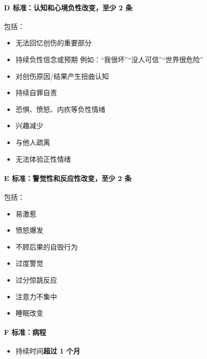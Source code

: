 \documentclass[
  chinese,
  9pt,
  a4paper,
]{ctexart}
\providecommand{\tightlist}{%
  \setlength{\itemsep}{0pt}\setlength{\parskip}{0pt}}
\begin{document}
\paragraph{D 标准：认知和心境负性改变，至少 2
条}\label{d-ux6807ux51c6ux8ba4ux77e5ux548cux5fc3ux5883ux8d1fux6027ux6539ux53d8ux81f3ux5c11-2-ux6761}

包括：

\begin{itemize}
\tightlist
\item
  无法回忆创伤的重要部分
\item
  持续负性信念或预期 例如：``我很坏''``没人可信''``世界很危险''
\item
  对创伤原因/结果产生扭曲认知
\item
  持续自罪自责
\item
  恐惧、愤怒、内疚等负性情绪
\item
  兴趣减少
\item
  与他人疏离
\item
  无法体验正性情绪
\end{itemize}

\paragraph{E 标准：警觉性和反应性改变，至少 2
条}\label{e-ux6807ux51c6ux8b66ux89c9ux6027ux548cux53cdux5e94ux6027ux6539ux53d8ux81f3ux5c11-2-ux6761}

包括：

\begin{itemize}
\tightlist
\item
  易激惹
\item
  愤怒爆发
\item
  不顾后果的自毁行为
\item
  过度警觉
\item
  过分惊跳反应
\item
  注意力不集中
\item
  睡眠改变
\end{itemize}

\paragraph{F 标准：病程}\label{f-ux6807ux51c6ux75c5ux7a0b}

\begin{itemize}
\tightlist
\item
  持续时间\textbf{超过 1 个月}
\end{itemize}
\end{document}
